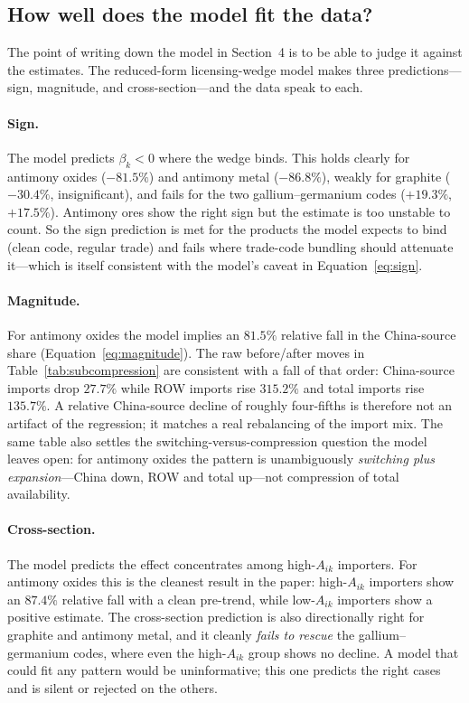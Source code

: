 \documentclass[12pt,a4paper]{article}
\begin{document}


\subsection{How well does the model fit the data?}\label{sec:reading}

The point of writing down the model in Section~4 is to be able to judge it
against the estimates. The reduced-form licensing-wedge model makes three
predictions---sign, magnitude, and cross-section---and the data speak to each.

\paragraph{Sign.} The model predicts $\beta_k<0$ where the wedge binds. This
holds clearly for antimony oxides ($-81.5\%$) and antimony metal ($-86.8\%$),
weakly for graphite ($-30.4\%$, insignificant), and fails for the two
gallium--germanium codes ($+19.3\%$, $+17.5\%$). Antimony ores show the right
sign but the estimate is too unstable to count. So the sign prediction is met
for the products the model expects to bind (clean code, regular trade) and fails
where trade-code bundling should attenuate it---which is itself consistent with
the model's caveat in Equation~\eqref{eq:sign}.

\paragraph{Magnitude.} For antimony oxides the model implies an $81.5\%$
relative fall in the China-source share (Equation~\ref{eq:magnitude}). The raw
before/after moves in Table~\ref{tab:subcompression} are consistent with a fall
of that order: China-source imports drop $27.7\%$ while ROW imports rise
$315.2\%$ and total imports rise $135.7\%$. A relative China-source decline of
roughly four-fifths is therefore not an artifact of the regression; it matches a
real rebalancing of the import mix. The same table also settles the
switching-versus-compression question the model leaves open: for antimony oxides
the pattern is unambiguously \emph{switching plus expansion}---China down, ROW
and total up---not compression of total availability.

\paragraph{Cross-section.} The model predicts the effect concentrates among
high-$A_{ik}$ importers. For antimony oxides this is the cleanest result in the
paper: high-$A_{ik}$ importers show an $87.4\%$ relative fall with a clean
pre-trend, while low-$A_{ik}$ importers show a positive estimate. The cross-section
prediction is also directionally right for graphite and antimony metal, and it
cleanly \emph{fails to rescue} the gallium--germanium codes, where even the
high-$A_{ik}$ group shows no decline. A model that could fit any pattern would be
uninformative; this one predicts the right cases and is silent or rejected on the
others.
\end{document}
